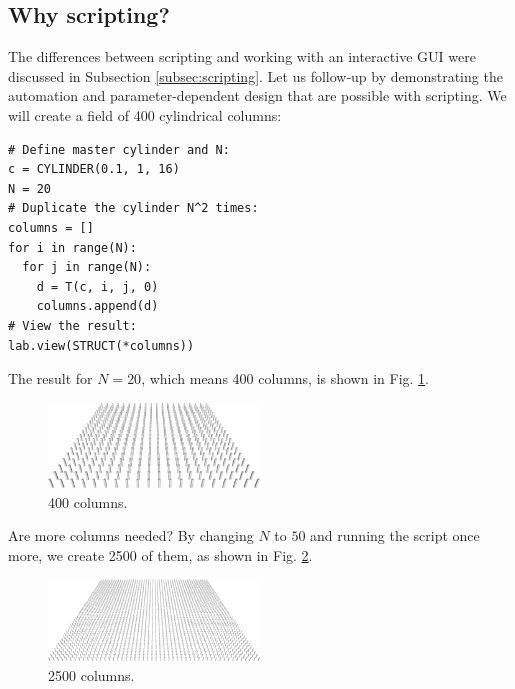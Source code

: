 \subsection{Why scripting?}

The differences between scripting and working with an interactive GUI 
were discussed in Subsection \ref{subsec:scripting}. Let us follow-up
by demonstrating the automation and parameter-dependent design that are 
possible with scripting. We will create a field of 400 cylindrical columns:\\

\begin{bbox}
\begin{verbatim}
# Define master cylinder and N:
c = CYLINDER(0.1, 1, 16)
N = 20
# Duplicate the cylinder N^2 times:
columns = []
for i in range(N):
  for j in range(N):
    d = T(c, i, j, 0)
    columns.append(d)
# View the result:
lab.view(STRUCT(*columns)) 
\end{verbatim}
\end{bbox}
\vspace{6mm}

\noindent
The result for $N = 20$, which means 400 columns, is shown 
in Fig. \ref{fig:400}.\\

\begin{figure}[!ht]
\begin{center}
\includegraphics[width=0.5\textwidth]{img/400.png}
\end{center}
\vspace{-4mm}
\caption{400 columns.}
\label{fig:400}
\end{figure}
\noindent
Are more columns needed? By changing $N$ to $50$ and running the script
once more, we create 2500 of them, as shown in Fig. \ref{fig:2500}.
\newpage

\begin{figure}[!ht]
\begin{center}
\includegraphics[width=0.5\textwidth]{img/2500.png}
\end{center}
\vspace{-4mm}
\caption{2500 columns.}
\label{fig:2500}
\end{figure}
\noindent


